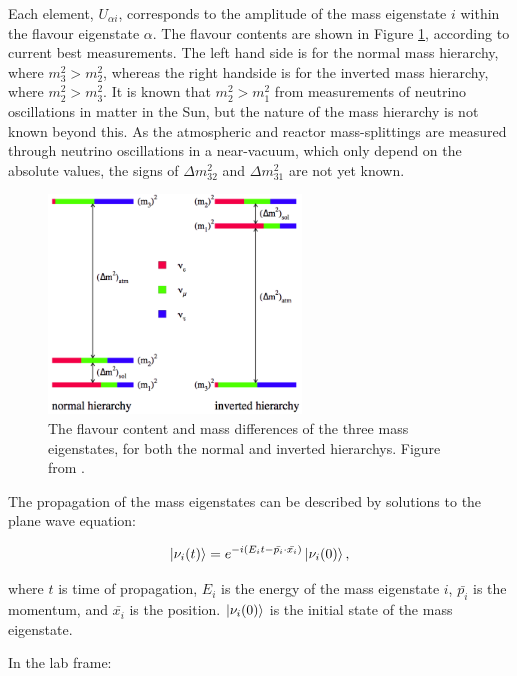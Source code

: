 Each element, $U_{\alpha i}$, corresponds to the amplitude of the mass eigenstate $i$ within the flavour eigenstate $\alpha$. The flavour contents are shown in Figure \ref{hierarchy}, according to current best measurements. The left hand side is for the normal mass hierarchy, where $m_3^2 > m_2^2$, whereas the right handside is for the inverted mass hierarchy, where $m_2^2 > m_3^2$. It is known that $m_2^2 > m_1^2$ from measurements of neutrino oscillations in matter in the Sun, but the nature of the mass hierarchy is not known beyond this. As the atmospheric and reactor mass-splittings are measured through neutrino oscillations in a near-vacuum, which only depend on the absolute values, the signs of $\Delta m_{32}^2$ and $\Delta m_{31}^2$ are not yet known.

\begin{figure}[!htbp]
\vspace{20pt}
\centering
\includegraphics*[width=0.6\textwidth,clip]{figs/hierfig}
\caption{The flavour content and mass differences of the three mass eigenstates, for both the normal and inverted hierarchys. Figure from \cite{hierarchyplot}.} \label{hierarchy}
\end{figure}

The propagation of the mass eigenstates can be described by solutions to the plane wave equation:

\begin{equation}
\ket{\nu_{i}(t)}=e^{-i(E_{i}t-\bar{p_i}\cdot\bar{x_i})}\ket{\nu_i(0)},
\label{eqn:masspropagation}
\end{equation}

where $t$ is time of propagation, $E_i$ is the energy of the mass eigenstate $i$, $\bar{p_i}$ is the momentum, and $\bar{x_i}$ is the position. $\ket{\nu_i(0)}$ is the initial state of the mass eigenstate.

In the lab frame:

